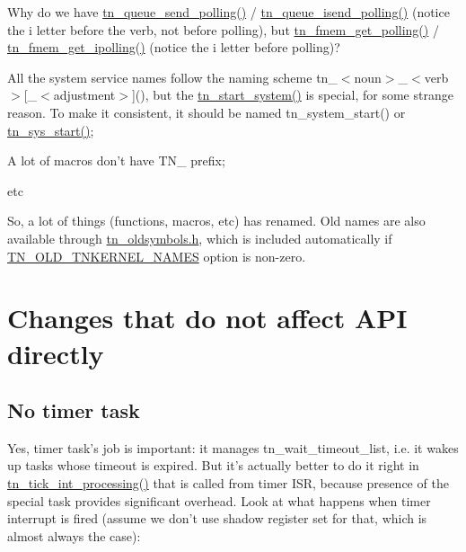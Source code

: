\begin{DoxyItemize}
\item Why do we have {\ttfamily \hyperlink{tn__dqueue_8h_af60c61c12ed90f4bcc7d13ca4da8562b}{tn\+\_\+queue\+\_\+send\+\_\+polling()}} / {\ttfamily \hyperlink{tn__dqueue_8h_ac059f15f07625ca25e4aac5790cce1ea}{tn\+\_\+queue\+\_\+isend\+\_\+polling()}} (notice the {\ttfamily i} letter before the verb, not before {\ttfamily polling}), but {\ttfamily \hyperlink{tn__fmem_8h_affea42ad41734fadfe8170b4234ca567}{tn\+\_\+fmem\+\_\+get\+\_\+polling()}} / {\ttfamily \hyperlink{tn__oldsymbols_8h_a4293c359514306825a9007f071b2ad3f}{tn\+\_\+fmem\+\_\+get\+\_\+ipolling()}} (notice the {\ttfamily i} letter before {\ttfamily polling})?
\item All the system service names follow the naming scheme {\ttfamily tn\+\_\+$<$noun$>$\+\_\+$<$verb$>$\mbox{[}\+\_\+$<$adjustment$>$\mbox{]}()}, but the {\ttfamily \hyperlink{tn__oldsymbols_8h_a566625be14a6eed4a3574e3d31e776fc}{tn\+\_\+start\+\_\+system()}} is special, for some strange reason. To make it consistent, it should be named {\ttfamily tn\+\_\+system\+\_\+start()} or {\ttfamily \hyperlink{tn__sys_8h_a62ab25d9d8ca01c02d368968f19e49bf}{tn\+\_\+sys\+\_\+start()}};
\item A lot of macros don't have {\ttfamily T\+N\+\_\+} prefix;
\item etc
\end{DoxyItemize}

So, a lot of things (functions, macros, etc) has renamed. Old names are also available through {\ttfamily \hyperlink{tn__oldsymbols_8h}{tn\+\_\+oldsymbols.\+h}}, which is included automatically if {\ttfamily \hyperlink{tn__cfg__default_8h_ae9854c723c6a823c9126aa8390977d39}{T\+N\+\_\+\+O\+L\+D\+\_\+\+T\+N\+K\+E\+R\+N\+E\+L\+\_\+\+N\+A\+M\+E\+S}} option is non-\/zero.\hypertarget{tnkernel_diff_tnkernel_diff_other}{}\section{Changes that do not affect A\+P\+I directly}\label{tnkernel_diff_tnkernel_diff_other}
\hypertarget{tnkernel_diff_tnkernel_diff_timer_task}{}\subsection{No timer task}\label{tnkernel_diff_tnkernel_diff_timer_task}
Yes, timer task's job is important\+: it manages {\ttfamily tn\+\_\+wait\+\_\+timeout\+\_\+list}, i.\+e. it wakes up tasks whose timeout is expired. But it's actually better to do it right in {\ttfamily \hyperlink{tn__sys_8h_a944d96c7a5d442d271115b6cb22a085b}{tn\+\_\+tick\+\_\+int\+\_\+processing()}} that is called from timer I\+S\+R, because presence of the special task provides significant overhead. Look at what happens when timer interrupt is fired (assume we don't use shadow register set for that, which is almost always the case)\+:

